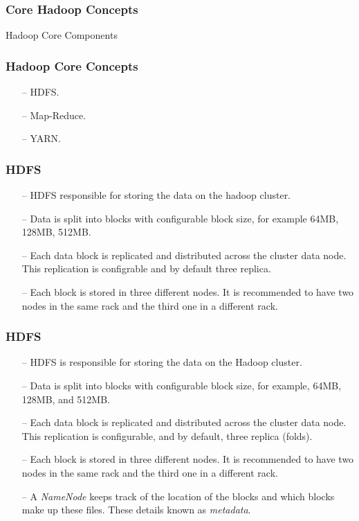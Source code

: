 \begin{frame}[c]{ }
	\frametitle{Core Hadoop Concepts }
	\centering     
	
	\textcolor{offgreen}{ \large Hadoop Core Components}
\end{frame}
\begin{frame}[c]{ }
	\frametitle{Hadoop Core Concepts }
	
	
	\begin{itemize}  [<+->]
		\item [--] HDFS.
		\item [--] Map-Reduce.
		\item [--] YARN.
		
	\end{itemize}
\end{frame}
\begin{frame}[c]{ }
	\frametitle{HDFS }
	
	
	\begin{itemize}  [<+->]
		\item [--] HDFS responsible for storing the data on the hadoop cluster.
		\item [--] Data is split into blocks with configurable block size, for example 64MB, 128MB, 512MB.
		\item [--] Each data block is replicated and distributed across the cluster data node. This replication is configrable and by default three replica.
		\item [--] Each block is stored in three different nodes. It is recommended to have two nodes in the same rack and the third one in a different rack.
		
	\end{itemize}
\end{frame}
\begin{frame}[c]{ }
	\frametitle{HDFS }
	
	
	\begin{itemize}  [<+->]
		\item [--] {\footnotesize HDFS is responsible for storing the data on the Hadoop cluster.}
		\item [--] {\footnotesize Data is split into blocks with configurable block size, for example, 64MB, 128MB, and 512MB.}
		\item [--] {\footnotesize Each data block is replicated and distributed across the cluster data node. This replication is configurable, and by default, three replica (folds).}
		\item [--] {\footnotesize Each block is stored in three different nodes. It is recommended to have two nodes in the same rack and the third one in a different rack.}
		\item [--] {\footnotesize A \textit{NameNode} keeps track of the location of the blocks and which blocks make up these files. These details known as \textit{metadata}.}
	\end{itemize}
\end{frame}
